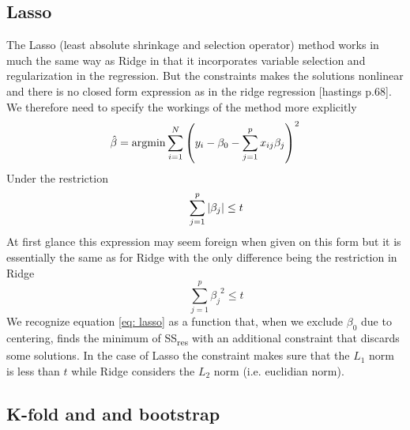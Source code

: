 \subsection{Lasso}
The Lasso (least absolute shrinkage and selection operator) method works in much the same way as Ridge in that it incorporates variable selection and regularization in the regression. But the constraints makes the solutions nonlinear and there is no closed form expression as in the ridge regression [hastings p.68]. We therefore need to specify the workings of the method more explicitly
\begin{equation}\label{eq: lasso}
	\hat{\beta} = \mathrm{argmin}\sum_{i=1}^N\qty( y_i - \beta_0 - \sum_{j=1}^p x_{ij}\beta_j )^2
\end{equation}
Under the restriction
\begin{equation}\label{eq: lasso restriction}
	\qquad \sum_{j=1}^p\abs{\beta_j}\leq t
\end{equation}
At first glance this expression may seem foreign when given on this form but it is essentially the same as for Ridge with the only difference being the restriction in Ridge
\begin{equation}\label{eq: ridge restriction}
	\qquad \sum_{j=1}^p{\beta_j}^2\leq t
\end{equation}
We recognize equation \ref{eq: lasso} as a function that, when we exclude $\beta_0$ due to centering, finds the minimum of SS\textsubscript{res} with an additional constraint that discards some solutions. In the case of Lasso the constraint makes sure that the $L_1$ norm is less than $t$ while Ridge considers the $L_2$ norm (i.e. euclidian norm). 
\subsection{K-fold and and bootstrap}

